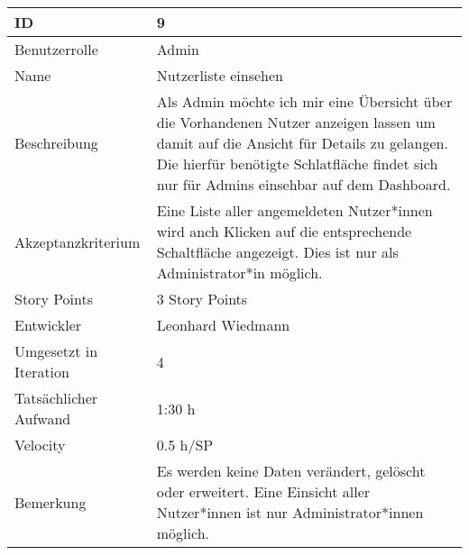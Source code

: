 \begin{tabularx}{\textwidth}{|p{}|X|}
	\hline
	ID & 9\\
	\hline
	Benutzerrolle & Admin\\
	\hline
	Name & Nutzerliste einsehen\\
	\hline
	Beschreibung & Als Admin möchte ich mir eine Übersicht über die Vorhandenen Nutzer anzeigen lassen um damit auf die Ansicht für Details zu gelangen. Die hierfür benötigte Schlatfläche findet sich nur für Admins einsehbar auf dem Dashboard.\\
	\hline
	Akzeptanzkriterium & Eine Liste aller angemeldeten Nutzer*innen wird anch Klicken auf die entsprechende Schaltfläche angezeigt. Dies ist nur als Administrator*in möglich.\\
	\hline
	Story Points & 3 Story Points\\
	\hline
	Entwickler & Leonhard Wiedmann\\
	\hline
	Umgesetzt in Iteration & 4\\
	\hline
	Tatsächlicher Aufwand & 1:30 h\\
	\hline
	Velocity & 0.5 h/SP\\
	\hline
	Bemerkung & Es werden keine Daten verändert, gelöscht oder erweitert. Eine Einsicht aller Nutzer*innen ist nur Administrator*innen möglich.\\
	\hline
\end{tabularx}
\vspace{20pt}
